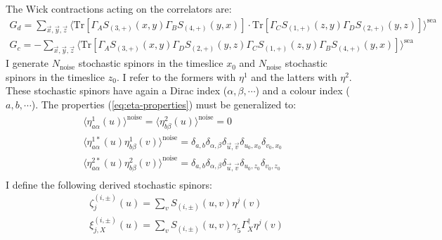 \documentclass[english, LaM, oneside, noexaminfo]{sapthesis}
\begin{document}
\newline
The Wick contractions acting on the correlators are:
\begin{equation}\label{eq:contractions-stochastic-method}
    \begin{gathered}
        G_d = \sum_{\vec x, \vec y, \vec z} \bigg\langle \text{Tr}\left[\Gamma_A S_{(3,+)}(x,y)\Gamma_B S_{(4,+)}(y,x)\right]\cdot\text{Tr}\left[\Gamma_C S_{(1,+)}(z,y)\Gamma_D S_{(2,+)}(y,z)\right] \bigg\rangle^{\text{sea}} \\
        G_c = - \sum_{\vec x, \vec y, \vec z} \bigg\langle \text{Tr}\left[\Gamma_A S_{(3,+)}(x,y)\Gamma_D S_{(2,+)}(y,z)\Gamma_C S_{(1,+)}(z,y)\Gamma_B S_{(4,+)}(y,x)\right] \bigg\rangle^{\text{sea}}
    \end{gathered}
\end{equation}
\newline
I generate $N_{\text{noise}}$ stochastic spinors in the timeslice $x_0$ and $N_{\text{noise}}$ stochastic spinors in the timeslice $z_0$.
I refer to the formers with $\eta^{1}$ and the latters with $\eta^{2}$.
These stochastic spinors have again a Dirac index ($\alpha,\beta,\cdots$) and a colour index ($a,b,\cdots$).
The properties (\ref{eq:eta-properties}) must be generalized to:
\begin{equation}
    \begin{gathered}
        \langle \eta^{1}_{a\alpha} (u) \rangle^{\text{noise}} = \langle \eta^{2}_{b\beta} (u) \rangle^{\text{noise}} = 0 \\
        \langle \eta^{1*}_{a\alpha} (u) \eta^{1}_{b\beta} (v) \rangle^{\text{noise}} = \delta_{a,b} \delta_{\alpha,\beta} \delta_{\vec u, \vec v} \delta_{u_0,x_0} \delta_{v_0,x_0} \\
        \langle \eta^{2*}_{a\alpha} (u) \eta^{2}_{b\beta} (v) \rangle^{\text{noise}} = \delta_{a,b} \delta_{\alpha,\beta} \delta_{\vec u, \vec v} \delta_{u_0,z_0} \delta_{v_0,z_0} \\
    \end{gathered}
\end{equation}
I define the following derived stochastic spinors:
\begin{equation}
    \begin{aligned}
        & \zeta^{(i,\pm)}_{j} (u) = \sum_{v} S_{(i,\pm)}(u,v)\eta^{j}(v) \\
        & \xi^{(i,\pm)}_{j,X} (u) = \sum_{v} S_{(i,\pm)}(u,v) \gamma_5 \Gamma_X^\dag \eta^{j}(v)
    \end{aligned}
\end{equation}
\end{document}
